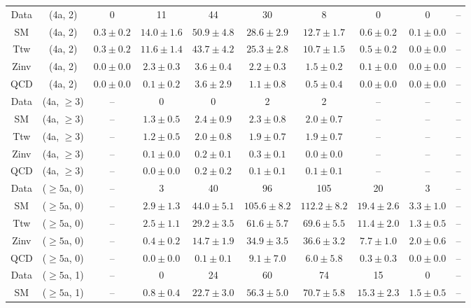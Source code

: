 \begin{table}[h!]
{\begin{tabular}{cccccccccc}
	Data & (4a, 2) & 0 & 11 & 44 & 30 & 8 & 0 & 0 & -- \\[0.5ex] 
	SM & (4a, 2) & $0.3\pm 0.2$ & $14.0\pm 1.6$ & $50.9\pm 4.8$ & $28.6\pm 2.9$ & $12.7\pm 1.7$ & $0.6\pm 0.2$ & $0.1\pm 0.0$ & -- \\[0.5ex] 
	Ttw & (4a, 2) & $0.3\pm 0.2$ & $11.6\pm 1.4$ & $43.7\pm 4.2$ & $25.3\pm 2.8$ & $10.7\pm 1.5$ & $0.5\pm 0.2$ & $0.0\pm 0.0$ & -- \\[0.5ex] 
	Zinv & (4a, 2) & $0.0\pm 0.0$ & $2.3\pm 0.3$ & $3.6\pm 0.4$ & $2.2\pm 0.3$ & $1.5\pm 0.2$ & $0.1\pm 0.0$ & $0.0\pm 0.0$ & -- \\[0.5ex] 
	QCD & (4a, 2) & $0.0\pm 0.0$ & $0.1\pm 0.2$ & $3.6\pm 2.9$ & $1.1\pm 0.8$ & $0.5\pm 0.4$ & $0.0\pm 0.0$ & $0.0\pm 0.0$ & -- \\[0.5ex] 
	Data & (4a, $\ge3$) & -- & 0 & 0 & 2 & 2 & -- & -- & -- \\[0.5ex] 
	SM & (4a, $\ge3$) & -- & $1.3\pm 0.5$ & $2.4\pm 0.9$ & $2.3\pm 0.8$ & $2.0\pm 0.7$ & -- & -- & -- \\[0.5ex] 
	Ttw & (4a, $\ge3$) & -- & $1.2\pm 0.5$ & $2.0\pm 0.8$ & $1.9\pm 0.7$ & $1.9\pm 0.7$ & -- & -- & -- \\[0.5ex] 
	Zinv & (4a, $\ge3$) & -- & $0.1\pm 0.0$ & $0.2\pm 0.1$ & $0.3\pm 0.1$ & $0.0\pm 0.0$ & -- & -- & -- \\[0.5ex] 
	QCD & (4a, $\ge3$) & -- & $0.0\pm 0.0$ & $0.2\pm 0.2$ & $0.1\pm 0.1$ & $0.1\pm 0.1$ & -- & -- & -- \\[0.5ex] 
	Data & ($\ge5$a, 0) & -- & 3 & 40 & 96 & 105 & 20 & 3 & -- \\[0.5ex] 
	SM & ($\ge5$a, 0) & -- & $2.9\pm 1.3$ & $44.0\pm 5.1$ & $105.6\pm 8.2$ & $112.2\pm 8.2$ & $19.4\pm 2.6$ & $3.3\pm 1.0$ & -- \\[0.5ex] 
	Ttw & ($\ge5$a, 0) & -- & $2.5\pm 1.1$ & $29.2\pm 3.5$ & $61.6\pm 5.7$ & $69.6\pm 5.5$ & $11.4\pm 2.0$ & $1.3\pm 0.5$ & -- \\[0.5ex] 
	Zinv & ($\ge5$a, 0) & -- & $0.4\pm 0.2$ & $14.7\pm 1.9$ & $34.9\pm 3.5$ & $36.6\pm 3.2$ & $7.7\pm 1.0$ & $2.0\pm 0.6$ & -- \\[0.5ex] 
	QCD & ($\ge5$a, 0) & -- & $0.0\pm 0.0$ & $0.1\pm 0.1$ & $9.1\pm 7.0$ & $6.0\pm 5.8$ & $0.3\pm 0.3$ & $0.0\pm 0.0$ & -- \\[0.5ex] 
	Data & ($\ge5$a, 1) & -- & 0 & 24 & 60 & 74 & 15 & 0 & -- \\[0.5ex] 
	SM & ($\ge5$a, 1) & -- & $0.8\pm 0.4$ & $22.7\pm 3.0$ & $56.3\pm 5.0$ & $70.7\pm 5.8$ & $15.3\pm 2.3$ & $1.5\pm 0.5$ & -- \\[0.5ex] 

\end{tabular}}
\end{table}
